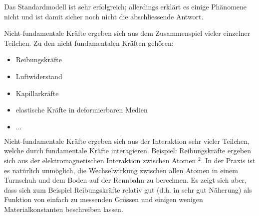 Das Standardmodell ist sehr erfolgreich; allerdings erklärt es einige Phänomene nicht und ist damit sicher noch nicht die abschliessende Antwort.

Nicht-fundamentale Kräfte ergeben sich aus dem Zusammenspiel vieler einzelner Teilchen. Zu den nicht fundamentalen Kräften gehören:

\begin{itemize}
  \item Reibungskräfte
  \item Luftwiderstand
  \item Kapillarkräfte
  \item elastische Kräfte in deformierbaren Medien
  \item $\ldots$
\end{itemize}

Nicht-fundamentale Kräfte ergeben sich aus der Interaktion sehr vieler Teilchen, welche durch fundamentale Kräfte interagieren. Beispiel: Reibungskräfte ergeben sich aus der elektromagnetischen Interaktion zwischen Atomen ${ }^{2}$. In der Praxis ist es natürlich unmöglich, die Wechselwirkung zwischen allen Atomen in einem Turnschuh und dem Boden auf der Rennbahn zu berechnen. Es zeigt sich aber, dass sich zum Beispiel Reibungskräfte relativ gut (d.h. in sehr gut Näherung) als Funktion von einfach zu messenden Grössen und einigen wenigen Materialkonstanten beschreiben lassen.
